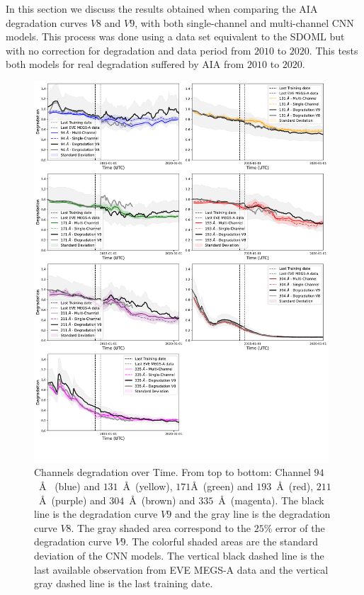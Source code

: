 \documentclass{aa}
\begin{document}
In this section we discuss the results obtained when comparing the AIA degradation curves $V8$ and $V9$, with both single-channel and multi-channel CNN models. This process was done using a data set equivalent to the SDOML but with no correction for degradation and data period from $2010$ to $2020$. This tests both models for real degradation suffered by AIA from $2010$ to $2020$.
\begin{figure}
	\centering
		\centering
        \includegraphics[width=0.98\textwidth]{luiz_exp_36_apodize_Degradation.pdf} 
        \caption{Channels degradation over Time. From top to bottom: Channel $94$~\AA~ (blue) and $131$~\AA~(yellow), $171$\AA~(green) and $193$~\AA~(red), $211$~\AA~(purple) and $304$~\AA~(brown) and $335$~\AA~(magenta). The black line is the degradation curve $V9$ and the gray line is the degradation curve $V8$. The gray shaded area correspond to the $25\%$ error of the degradation curve $V9$. The colorful shaded areas are the standard deviation of the CNN models. The vertical black dashed line is the last available observation from EVE MEGS-A data and the vertical gray dashed line is the last training date.}
        \label{fig:degradation_curve}
\end{figure}
\end{document}
